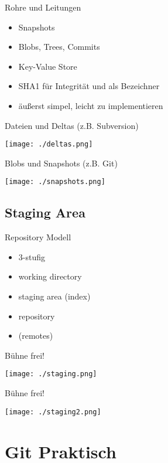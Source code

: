 \begin{frame}{Rohre und Leitungen}
    \begin{itemize}[<+->]
        \item Snapshots
        \item Blobs, Trees, Commits
        \item Key-Value Store
        \item SHA1 für Integrität und als Bezeichner
        \item äußerst simpel, leicht zu implementieren
    \end{itemize}
\end{frame}

\begin{frame}{Dateien und Deltas (z.B. Subversion)}
    \centerline{\texttt{[image: ./deltas.png]}}
\end{frame}

\begin{frame}{Blobs und Snapshots (z.B. Git)}
    \centerline{\texttt{[image: ./snapshots.png]}}
\end{frame}

\subsection{Staging Area}

\begin{frame}{Repository Modell}
    \begin{itemize}[<+->]
        \item 3-stufig
        \item working directory
        \item staging area (index)
        \item repository
        \item (remotes)
    \end{itemize}
\end{frame}

\begin{frame}{Bühne frei!}
    \centerline{\texttt{[image: ./staging.png]}}
\end{frame}

\begin{frame}{Bühne frei!}
    \centerline{\texttt{[image: ./staging2.png]}}
\end{frame}

\section{Git Praktisch}
